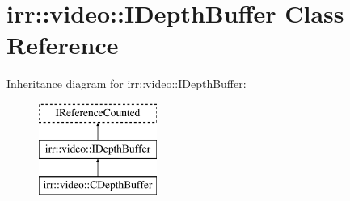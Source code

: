 \hypertarget{classirr_1_1video_1_1_i_depth_buffer}{\section{irr\-:\-:video\-:\-:I\-Depth\-Buffer Class Reference}
\label{classirr_1_1video_1_1_i_depth_buffer}
}
Inheritance diagram for irr\-:\-:video\-:\-:I\-Depth\-Buffer\-:\begin{figure}[H]
\begin{center}
\leavevmode
\includegraphics[height=3.000000cm]{classirr_1_1video_1_1_i_depth_buffer}
\end{center}
\end{figure}
